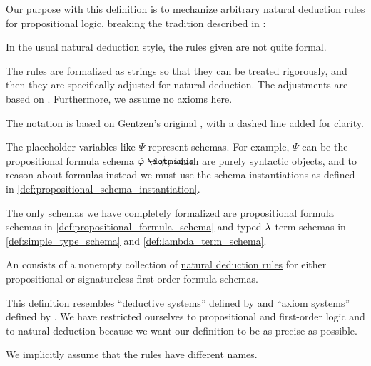 \begin{comments}
  \item Our purpose with this definition is to mechanize arbitrary natural deduction rules for propositional logic, breaking the tradition described in \cite[13]{MartinLöf1984IntuitionisticTypeTheory}:
  \begin{displayquote}
    In the usual natural deduction style, the rules given are not quite formal.
  \end{displayquote}

  The rules are formalized as strings so that they can be treated rigorously, and then they are specifically adjusted for natural deduction. The adjustments are based on \cite[\S 2.1]{TroelstraSchwichtenberg2000BasicProofTheory}. Furthermore, we assume no axioms here.

  The notation is based on Gentzen's original \cite[186]{Gentzen1935LogischeSchließen}, with a dashed line added for clarity.

  \item The placeholder variables like \( \Psi \) represent schemas. For example, \( \Psi \) can be the propositional formula schema \( \syn\varphi \synimplies \syn\psi \), which are purely syntactic objects, and to reason about formulas instead we must use the schema instantiations as defined in \cref{def:propositional_schema_instantiation}.

  \item The only schemas we have completely formalized are propositional formula schemas in \cref{def:propositional_formula_schema} and typed \( {\mathrm \lambda} \)-term schemas in \cref{def:simple_type_schema} and \cref{def:lambda_term_schema}.
\end{comments}

\begin{definition}\label{def:abstract_natural_deduction_system}\mimprovised
  An  consists of a nonempty collection of \hyperref[def:natural_deduction_rule]{natural deduction rules} for either propositional or signatureless first-order formula schemas.
\end{definition}
\begin{comments}
  \item This definition resembles \enquote{deductive systems} defined by  and \enquote{axiom systems} defined by . We have restricted ourselves to propositional and first-order logic and to natural deduction because we want our definition to be as precise as possible.
  \item We implicitly assume that the rules have different names.
\end{comments}

